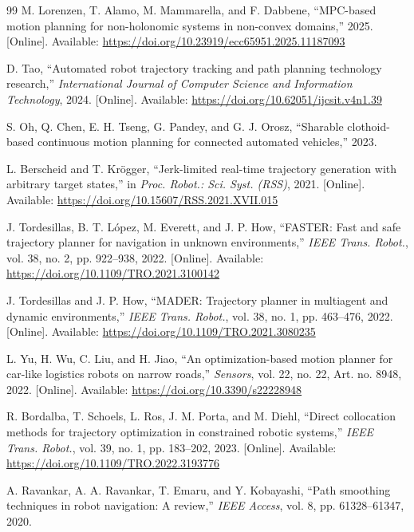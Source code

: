 \begin{thebibliography}{99}
M. Lorenzen, T. Alamo, M. Mammarella, and F. Dabbene, ``MPC-based motion planning for non-holonomic systems in non-convex domains,'' 2025. [Online]. Available: \url{https://doi.org/10.23919/ecc65951.2025.11187093}

D. Tao, ``Automated robot trajectory tracking and path planning technology research,'' \emph{International Journal of Computer Science and Information Technology}, 2024. [Online]. Available: \url{https://doi.org/10.62051/ijcsit.v4n1.39}

S. Oh, Q. Chen, E. H. Tseng, G. Pandey, and G. J. Orosz, ``Sharable clothoid-based continuous motion planning for connected automated vehicles,'' 2023.


L. Berscheid and T. Kr\"ogger, ``Jerk-limited real-time trajectory generation with arbitrary target states,'' in \emph{Proc. Robot.: Sci. Syst. (RSS)}, 2021. [Online]. Available: \url{https://doi.org/10.15607/RSS.2021.XVII.015}

J. Tordesillas, B. T. L\'opez, M. Everett, and J. P. How, ``FASTER: Fast and safe trajectory planner for navigation in unknown environments,'' \emph{IEEE Trans. Robot.}, vol. 38, no. 2, pp. 922--938, 2022. [Online]. Available: \url{https://doi.org/10.1109/TRO.2021.3100142}

J. Tordesillas and J. P. How, ``MADER: Trajectory planner in multiagent and dynamic environments,'' \emph{IEEE Trans. Robot.}, vol. 38, no. 1, pp. 463--476, 2022. [Online]. Available: \url{https://doi.org/10.1109/TRO.2021.3080235}

L. Yu, H. Wu, C. Liu, and H. Jiao, ``An optimization-based motion planner for car-like logistics robots on narrow roads,'' \emph{Sensors}, vol. 22, no. 22, Art. no. 8948, 2022. [Online]. Available: \url{https://doi.org/10.3390/s22228948}

R. Bordalba, T. Schoels, L. Ros, J. M. Porta, and M. Diehl, ``Direct collocation methods for trajectory optimization in constrained robotic systems,'' \emph{IEEE Trans. Robot.}, vol. 39, no. 1, pp. 183--202, 2023. [Online]. Available: \url{https://doi.org/10.1109/TRO.2022.3193776}

A. Ravankar, A. A. Ravankar, T. Emaru, and Y. Kobayashi, ``Path smoothing techniques in robot navigation: A review,'' \emph{IEEE Access}, vol. 8, pp. 61328--61347, 2020.


\end{thebibliography}
